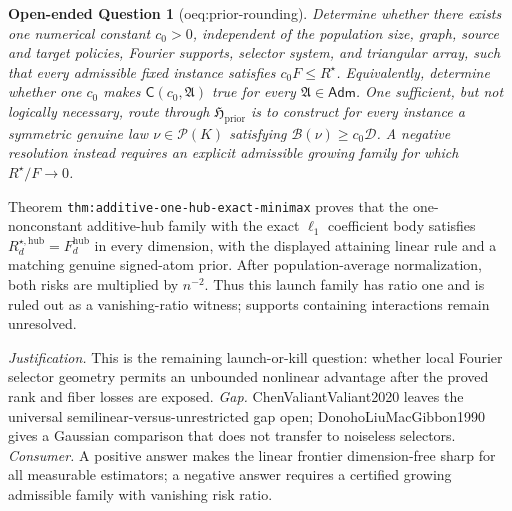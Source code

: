 \documentclass{article}
\newtheorem{openendedquestion}{Open-ended Question}
\begin{document}
\begin{openendedquestion}[oeq:prior-rounding]\label{oeq:prior-rounding}
Determine whether there exists one numerical constant \(c_0>0\), independent of the population size, graph, source and target policies, Fourier supports, selector system, and triangular array, such that every admissible fixed instance satisfies \(c_0F\le R^{\star}\). Equivalently, determine whether one \(c_0\) makes \(\mathsf C(c_0,\mathfrak A)\) true for every \(\mathfrak A\in\mathsf{Adm}\). One sufficient, but not logically necessary, route through \(\mathfrak H_{\mathrm{prior}}\) is to construct for every instance a symmetric genuine law \(\nu\in\mathcal P(K)\) satisfying \(\mathcal B(\nu)\ge c_0\mathcal D\). A negative resolution instead requires an explicit admissible growing family for which \(R^{\star}/F\to0\).
\end{openendedquestion}
Theorem \texttt{thm:additive-one-hub-exact-minimax} proves that the one-nonconstant additive-hub family with the exact \(\ell_1\) coefficient body satisfies \(R_d^{\star,\mathrm{hub}}=F_d^{\mathrm{hub}}\) in every dimension, with the displayed attaining linear rule and a matching genuine signed-atom prior.  After population-average normalization, both risks are multiplied by \(n^{-2}\).  Thus this launch family has ratio one and is ruled out as a vanishing-ratio witness; supports containing interactions remain unresolved.
\par\smallskip\noindent \textit{Justification.} This is the remaining launch-or-kill question: whether local Fourier selector geometry permits an unbounded nonlinear advantage after the proved rank and fiber losses are exposed. \textit{Gap.} ChenValiantValiant2020 leaves the universal semilinear-versus-unrestricted gap open; DonohoLiuMacGibbon1990 gives a Gaussian comparison that does not transfer to noiseless selectors. \textit{Consumer.} A positive answer makes the linear frontier dimension-free sharp for all measurable estimators; a negative answer requires a certified growing admissible family with vanishing risk ratio.
\end{document}
